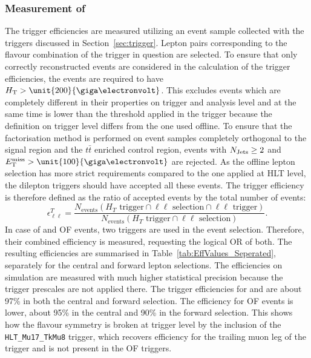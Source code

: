 \subsubsection{Measurement of \RT}
\label{sec:triggerEffs}
The trigger efficiencies are measured utilizing an event sample collected with the \HT triggers discussed in Section~\ref{sec:trigger}. Lepton pairs corresponding to the flavour combination of the trigger in question are selected. To ensure that only correctly reconstructed events are considered in the calculation of the trigger efficiencies, the events are required to have $\HT > \unit{200}{\giga\electronvolt}$. This excludes events which are completely different in their properties on trigger and analysis level and at the same time is lower than the threshold applied in the trigger because the \HT definition on trigger level differs from the one used offline. To ensure that the factorisation method is performed on event samples completely orthogonal to the signal region and the $t\bar{t}$ enriched control region, events with $N_\text{Jets} \geq 2$ and $\MET > \unit{100}{\giga\electronvolt}$ are rejected. As the offline lepton selection has more strict requirements compared to the one applied at HLT level, the dilepton triggers should have accepted all these events. The trigger efficiency is therefore defined as the ratio of accepted events by the total number of events:
\begin{equation}
\epsilon_{\ell\ell}^T = \frac{N_{\text{events}}(H_T\text{ trigger} \cap \ell\ell\text{ selection} \cap \ell\ell\text{ trigger})}{N_{\text{events}}(H_T\text{ trigger} \cap \ell\ell\text{ selection})}.
\end{equation}
In case of \MM and OF events, two triggers are used in the event selection. Therefore, their combined efficiency is measured, requesting the logical OR of both. The resulting efficiencies are summarised in Table~\ref{tab:EffValues_Seperated}, separately for the central and forward lepton selections. The efficiencies on simulation are measured with much higher statistical precision because the trigger prescales are not applied there. The trigger efficiencies for \EE and \MM are about 97\% in both the central and forward selection. The efficiency for OF events is lower, about 95\% in the central and 90\% in the forward selection. This shows how the flavour symmetry is broken at trigger level by the inclusion of the \verb+HLT_Mu17_TkMu8+ trigger, which recovers efficiency for the trailing muon leg of the trigger and is not present in the OF triggers.   

